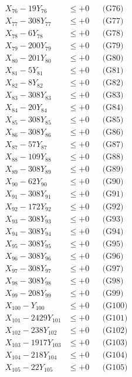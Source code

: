 \documentclass[a4paper,10pt]{article}
\begin{document}
{\begin{align}
X_{76} - 19Y_{76} &\leq +0 && \text{(G76)} \\
X_{77} - 308Y_{77} &\leq +0 && \text{(G77)} \\
X_{78} - 6Y_{78} &\leq +0 && \text{(G78)} \\
X_{79} - 200Y_{79} &\leq +0 && \text{(G79)} \\
X_{80} - 201Y_{80} &\leq +0 && \text{(G80)} \\
\allowbreak
X_{81} - 5Y_{81} &\leq +0 && \text{(G81)} \\
X_{82} - 8Y_{82} &\leq +0 && \text{(G82)} \\
X_{83} - 308Y_{83} &\leq +0 && \text{(G83)} \\
X_{84} - 20Y_{84} &\leq +0 && \text{(G84)} \\
X_{85} - 308Y_{85} &\leq +0 && \text{(G85)} \\
X_{86} - 308Y_{86} &\leq +0 && \text{(G86)} \\
X_{87} - 57Y_{87} &\leq +0 && \text{(G87)} \\
X_{88} - 109Y_{88} &\leq +0 && \text{(G88)} \\
X_{89} - 308Y_{89} &\leq +0 && \text{(G89)} \\
X_{90} - 62Y_{90} &\leq +0 && \text{(G90)} \\
\allowbreak
X_{91} - 308Y_{91} &\leq +0 && \text{(G91)} \\
X_{92} - 172Y_{92} &\leq +0 && \text{(G92)} \\
X_{93} - 308Y_{93} &\leq +0 && \text{(G93)} \\
X_{94} - 308Y_{94} &\leq +0 && \text{(G94)} \\
X_{95} - 308Y_{95} &\leq +0 && \text{(G95)} \\
X_{96} - 308Y_{96} &\leq +0 && \text{(G96)} \\
X_{97} - 308Y_{97} &\leq +0 && \text{(G97)} \\
X_{98} - 308Y_{98} &\leq +0 && \text{(G98)} \\
X_{99} - 208Y_{99} &\leq +0 && \text{(G99)} \\
X_{100} - Y_{100} &\leq +0 && \text{(G100)} \\
\allowbreak
X_{101} - 2429Y_{101} &\leq +0 && \text{(G101)} \\
X_{102} - 238Y_{102} &\leq +0 && \text{(G102)} \\
X_{103} - 1917Y_{103} &\leq +0 && \text{(G103)} \\
X_{104} - 218Y_{104} &\leq +0 && \text{(G104)} \\
X_{105} - 22Y_{105} &\leq +0 && \text{(G105)} \\

\end{align}}
\end{document}
